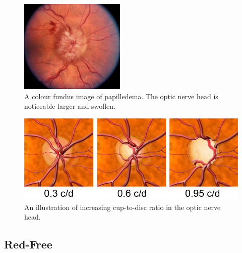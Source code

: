 \begin{figure}[H]
\centering
\includegraphics{figures/papilledema}
\caption{A colour fundus image of papilledema. The optic nerve head is noticeable larger and swollen.}
\label{fig:pap}
   \end{figure}

\begin{figure}[H]
\centering
\includegraphics{figures/opticnervecupping}
\caption{An illustration of increasing cup-to-disc ratio in the optic nerve head.}
\label{fig:cup}
   \end{figure}

	

\subsection{Red-Free}

